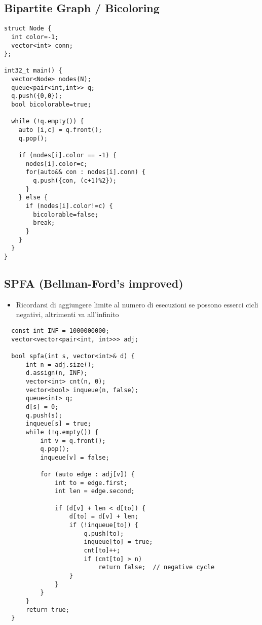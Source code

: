 \subsection{Bipartite Graph / Bicoloring}
\begin{lstlisting}
struct Node {
  int color=-1;
  vector<int> conn;
};

int32_t main() {
  vector<Node> nodes(N);
  queue<pair<int,int>> q;
  q.push({0,0});
  bool bicolorable=true;

  while (!q.empty()) {
    auto [i,c] = q.front();
    q.pop();

    if (nodes[i].color == -1) {
      nodes[i].color=c;
      for(auto&& con : nodes[i].conn) {
        q.push({con, (c+1)%2});
      }
    } else {
      if (nodes[i].color!=c) {
        bicolorable=false;
        break;
      }
    }
  }
}
\end{lstlisting}

\subsection{SPFA (Bellman-Ford's improved)}
\begin{itemize}
    \item Ricordarsi di aggiungere limite al numero di esecuzioni se possono esserci cicli negativi, altrimenti va all'infinito
\end{itemize}
\begin{lstlisting}
  const int INF = 1000000000;
  vector<vector<pair<int, int>>> adj;

  bool spfa(int s, vector<int>& d) {
      int n = adj.size();
      d.assign(n, INF);
      vector<int> cnt(n, 0);
      vector<bool> inqueue(n, false);
      queue<int> q;
      d[s] = 0;
      q.push(s);
      inqueue[s] = true;
      while (!q.empty()) {
          int v = q.front();
          q.pop();
          inqueue[v] = false;

          for (auto edge : adj[v]) {
              int to = edge.first;
              int len = edge.second;

              if (d[v] + len < d[to]) {
                  d[to] = d[v] + len;
                  if (!inqueue[to]) {
                      q.push(to);
                      inqueue[to] = true;
                      cnt[to]++;
                      if (cnt[to] > n)
                          return false;  // negative cycle
                  }
              }
          }
      }
      return true;
  }
\end{lstlisting}

